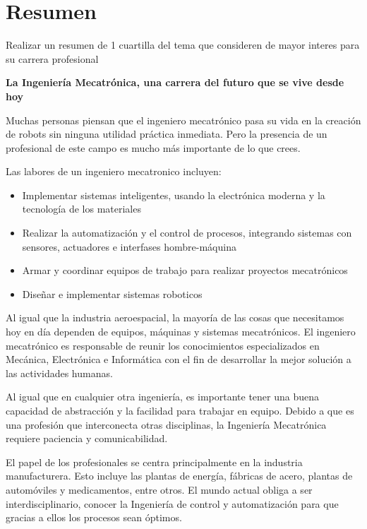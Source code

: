 \documentclass[a4paper,12pt]{article}
\begin{document}
\section{Resumen}
\justifying
\par
Realizar un resumen de 1 cuartilla del tema que consideren de mayor interes para su carrera profesional\\
\par
\textbf{La Ingeniería Mecatrónica, una carrera del futuro que se vive desde hoy}\\
\par
Muchas personas piensan que el ingeniero mecatrónico pasa su vida en la creación de robots sin ninguna utilidad práctica inmediata. Pero la presencia de un profesional de este campo es mucho más importante de lo que crees.\\
\par
Las labores de un ingeniero mecatronico incluyen:
\begin{itemize}
\item Implementar sistemas inteligentes, usando la electrónica moderna y la tecnología de los materiales
\item Realizar la automatización y el control de procesos, integrando sistemas con sensores, actuadores e interfases hombre-máquina
\item Armar y coordinar equipos de trabajo para realizar proyectos mecatrónicos
\item Diseñar e implementar sistemas roboticos
\end{itemize}
\par
Al igual que la industria aeroespacial, la mayoría de las cosas que necesitamos hoy en día dependen de equipos, máquinas y sistemas mecatrónicos. El ingeniero mecatrónico es responsable de reunir los conocimientos especializados en Mecánica, Electrónica e Informática con el fin de desarrollar la mejor solución a las actividades humanas.\\
\par
Al igual que en cualquier otra ingeniería, es importante tener una buena capacidad de abstracción y la facilidad para trabajar en equipo. Debido a que es una profesión que interconecta otras disciplinas, la Ingeniería Mecatrónica requiere paciencia y comunicabilidad.\\
\par
El papel de los profesionales se centra principalmente en la industria manufacturera. Esto incluye las plantas de energía, fábricas de acero, plantas de automóviles y medicamentos, entre otros. El mundo actual obliga a ser interdisciplinario, conocer la Ingeniería de control y automatización para que gracias a ellos los procesos sean óptimos.\\
\end{document}
